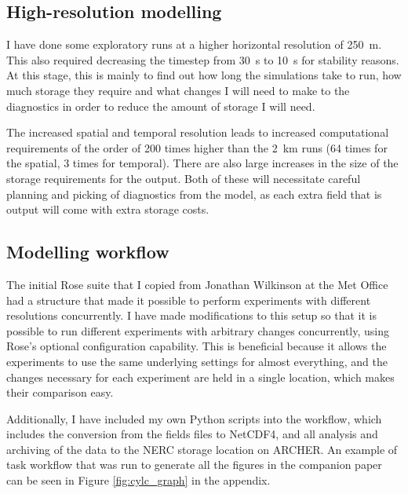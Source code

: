 \documentclass[11pt,a4paper]{article}
\begin{document}
\subsection{High-resolution modelling}
\label{sec:high_res_modeling}
I have done some exploratory runs at a higher horizontal resolution of \SI{250}{m}. This also required decreasing the timestep from \SI{30}{s} to \SI{10}{s} for stability reasons. At this stage, this is mainly to find out how long the simulations take to run, how much storage they require and what changes I will need to make to the diagnostics in order to reduce the amount of storage I will need.

The increased spatial and temporal resolution leads to increased computational requirements of the order of 200 times higher than the \SI{2}{km} runs (64 times for the spatial, 3 times for temporal). There are also large increases in the size of the storage requirements for the output. Both of these will necessitate careful planning and picking of diagnostics from the model, as each extra field that is output will come with extra storage costs. 





\subsection{Modelling workflow}
\label{sec:modelling_workflow}

The initial Rose suite that I copied from Jonathan Wilkinson at the Met Office had a structure that made it possible to perform experiments with different resolutions concurrently. I have made modifications to this setup so that it is possible to run different experiments with arbitrary changes concurrently, using Rose's optional configuration capability. This is beneficial because it allows the experiments to use the same underlying settings for almost everything, and the changes necessary for each experiment are held in a single location, which makes their comparison easy.

Additionally, I have included my own Python scripts into the workflow, which includes the conversion from the fields files to NetCDF4, and all analysis and archiving of the data to the NERC storage location on ARCHER. An example of task workflow that was run to generate all the figures in the companion paper can be seen in Figure \ref{fig:cylc_graph} in the appendix.
\end{document}
